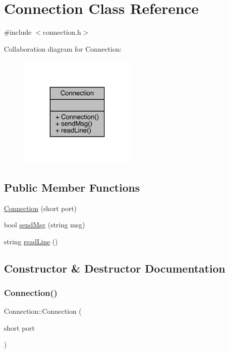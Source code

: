 \hypertarget{class_connection}{}\section{Connection Class Reference}
\label{class_connection}


{\ttfamily \#include $<$connection.\+h$>$}



Collaboration diagram for Connection\+:
\nopagebreak
\begin{figure}[H]
\begin{center}
\leavevmode
\includegraphics[width=162pt]{class_connection__coll__graph}
\end{center}
\end{figure}
\subsection*{Public Member Functions}
\begin{DoxyCompactItemize}
\item 
\hyperlink{class_connection_a8089476d48ba545f44e691cd4bd0278d}{Connection} (short port)
\item 
bool \hyperlink{class_connection_a4b9f6db1fb42fc9857f829fa0bc52e6e}{send\+Msg} (string msg)
\item 
string \hyperlink{class_connection_a1df16b436751b686d96c24ca0c498659}{read\+Line} ()
\end{DoxyCompactItemize}


\subsection{Constructor \& Destructor Documentation}
\hypertarget{class_connection_a8089476d48ba545f44e691cd4bd0278d}{}\label{class_connection_a8089476d48ba545f44e691cd4bd0278d} 
\subsubsection{\texorpdfstring{Connection()}{Connection()}}
{\footnotesize\ttfamily Connection\+::\+Connection (\begin{DoxyParamCaption}\item[{short}]{port }\end{DoxyParamCaption})}



